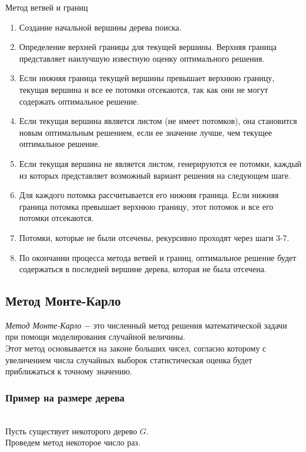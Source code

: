         \begin{algorithm}
        \caption{Метод ветвей и границ}
        \begin{algorithmic}
            \begin{enumerate}
                \item Создание начальной вершины дерева поиска.
                \item Определение верхней границы для текущей вершины. Верхняя граница представляет наилучшую известную оценку оптимального решения.
                \item Если нижняя граница текущей вершины превышает верхнюю границу, текущая вершина и все ее потомки отсекаются, так как они не могут содержать оптимальное решение.
                \item Если текущая вершина является листом (не имеет потомков), она становится новым оптимальным решением, если ее значение лучше, чем текущее оптимальное решение.
                \item Если текущая вершина не является листом, генерируются ее потомки, каждый из которых представляет возможный вариант решения на следующем шаге.
                \item Для каждого потомка рассчитывается его нижняя граница. Если нижняя граница потомка превышает верхнюю границу, этот потомок и все его потомки отсекаются.
                \item Потомки, которые не были отсечены, рекурсивно проходят через шаги 3-7.
                \item По окончании процесса метода ветвей и границ, оптимальное решение будет содержаться в последней вершине дерева, которая не была отсечена.
            \end{enumerate}
        \end{algorithmic}
        \end{algorithm}
        
    \subsection{Метод Монте-Карло}
        \textit{Метод Монте-Карло} $-$ это численный метод решения математической задачи при помощи моделирования случайной величины.\\
        Этот метод основывается на законе больших чисел, согласно которому с увеличением числа случайных выборок статистическая оценка будет приближаться к точному значению.
    
        \subsubsection{Пример на размере дерева}
            \\
            Пусть существует некоторого дерево $G$.\\
            Проведем метод некоторое число раз.\\
            
